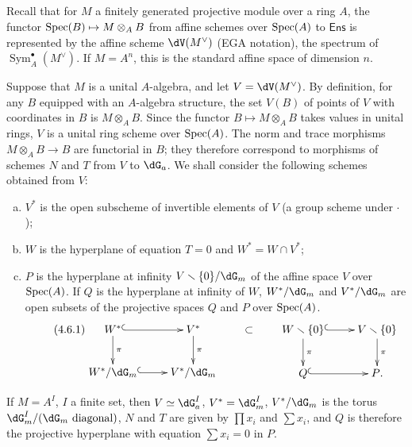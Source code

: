 \subsection{}\label{VI:4-6}

Recall that for $M$ a finitely generated projective module over a ring $A$, the 
functor $\operatorname{Spec}(B)\mapsto M\otimes_A B$ from affine schemes over $\operatorname{Spec}(A)$ 
to $\mathsf{Ens}$ is represented by the affine scheme $\dV(M^\vee)$ 
(EGA notation), the spectrum of $\operatorname{Sym}_A^\bullet(M^\vee)$. If 
$M=A^n$, this is the standard affine space of dimension $n$. 

Suppose that $M$ is a unital $A$-algebra, and let 
$V=\dV(M^\vee)$. By definition, for any $B$ equipped with an $A$-algebra structure, the set 
$V(B)$ of points of $V$ with coordinates in $B$ is $M\otimes_A B$. Since the 
functor $B\mapsto M\otimes_A B$ takes values in unital rings, 
$V$ is a unital ring scheme over $\operatorname{Spec}(A)$. The 
norm and trace morphisms $M\otimes_A B\to B$ are functorial in $B$; they 
therefore correspond to morphisms of schemes $N$ and $T$ from $V$ to 
$\dG_a$. We shall consider the following schemes obtained from $V$: 
\begin{enumerate}[a)]
  \item $V^\ast$ is the open subscheme of invertible elements of $V$ (a group 
    scheme under $\cdot$);
  \item $W$ is the hyperplane of equation $T=0$ and $W^\ast=W\cap V^\ast$; 
  \item $P$ is the hyperplane at infinity $V\setminus \{0\}/\dG_m$ of the affine 
    space $V$ over $\operatorname{Spec}(A)$. If $Q$ is the hyperplane at infinity of $W$, 
    $W^\ast/\dG_m$ and $V^\ast/\dG_m$ are open subsets of the projective spaces 
    $Q$ and $P$ over $\operatorname{Spec}(A)$. 
    \begin{equation*}\tag{4.6.1}\label{VI:eq:4-6-1}
    \xymatrix{
      W^\ast \ar@{^{(}->}[r] \ar[d]^-\pi 
        & V^\ast \ar[d]^-\pi \\
      W^\ast/\dG_m \ar@{^{(}->}[r] 
        & V^\ast/\dG_m 
    }\qquad\subset\qquad
    \xymatrix{
      W\setminus \{0\} \ar@{^{(}->}[r] \ar[d]^-\pi 
        & V\setminus \{0\} \ar[d]^-\pi \\
      Q \ar@{^{(}->}[r] 
        & P \text{.}
    }
    \end{equation*}
\end{enumerate}

If $M=A^I$, $I$ a finite set, then $V\simeq \dG_a^I$, $V^\ast=\dG_m^I$, 
$V^\ast/\dG_m$ is the torus $\dG_m^I/(\dG_m\text{ diagonal})$, $N$ and $T$ 
are given by $\prod x_i$ and $\sum x_i$, and $Q$ is therefore the projective 
hyperplane with equation $\sum x_i=0$ in $P$. 

